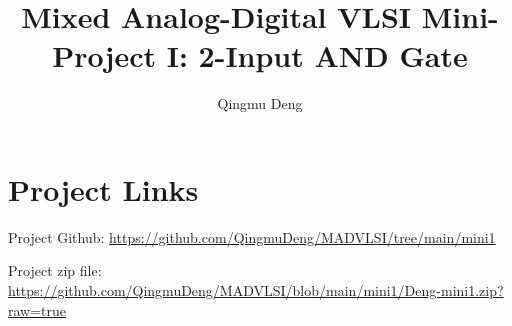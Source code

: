 \documentclass[11pt]{article}
\begin{document}
\title{Mixed Analog-Digital VLSI Mini-Project I: 2-Input AND Gate}
\author{Qingmu Deng}
\maketitle %

\section*{Project Links}

Project Github: \href{https://github.com/QingmuDeng/MADVLSI/tree/main/mini1}{https://github.com/QingmuDeng/MADVLSI/tree/main/mini1}

\noindent
Project zip file: \href{https://github.com/QingmuDeng/MADVLSI/blob/main/mini1/Deng-mini1.zip?raw=true}{https://github.com/QingmuDeng/MADVLSI/blob/main/mini1/Deng-mini1.zip?raw=true}
\end{document}
